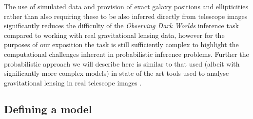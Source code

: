 The use of simulated data and provision of exact galaxy positions and ellipticities rather than also requiring these to be also inferred directly from telescope images significantly reduces the difficulty of the \emph{Observing Dark Worlds} inference task compared to working with real gravitational lensing data, however for the purposes of our exposition the task is still sufficiently complex to highlight the computational challenges inherent in probabilistic inference problems. Further the probabilistic approach we will describe here is similar to that used (albeit with significantly more complex models) in state of the art tools used to analyse gravitational lensing in real telescope images \citep{jullo2007bayesian}.



\subsection{Defining a model}


